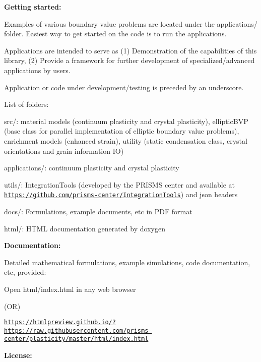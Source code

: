 {\bfseries Getting started\-:}

Examples of various boundary value problems are located under the applications/ folder. Easiest way to get started on the code is to run the applications.

Applications are intended to serve as (1) Demonstration of the capabilities of this library, (2) Provide a framework for further development of specialized/advanced applications by users.

Application or code under development/testing is preceded by an underscore.

List of folders\-:
\begin{DoxyItemize}
\item src/\-: material models (continuum plasticity and crystal plasticity), elliptic\-B\-V\-P (base class for parallel implementation of elliptic boundary value problems), enrichment models (enhanced strain), utility (static condensation class, crystal orientations and grain information I\-O)
\item applications/\-: continuum plasticity and crystal plasticity
\item utils/\-: Integration\-Tools (developed by the P\-R\-I\-S\-M\-S center and available at \href{https://github.com/prisms-center/IntegrationTools}{\tt https\-://github.\-com/prisms-\/center/\-Integration\-Tools}) and json headers
\item docs/\-: Formulations, example documents, etc in P\-D\-F format
\item html/\-: H\-T\-M\-L documentation generated by doxygen
\end{DoxyItemize}

{\bfseries Documentation\-:}

Detailed mathematical formulations, example simulations, code documentation, etc, provided\-:
\begin{DoxyItemize}
\item Open html/index.\-html in any web browser \par
 (O\-R)\par

\item \href{https://htmlpreview.github.io/?https://raw.githubusercontent.com/prisms-center/plasticity/master/html/index.html}{\tt https\-://htmlpreview.\-github.\-io/?https\-://raw.\-githubusercontent.\-com/prisms-\/center/plasticity/master/html/index.\-html}
\end{DoxyItemize}

{\bfseries License\-:}

